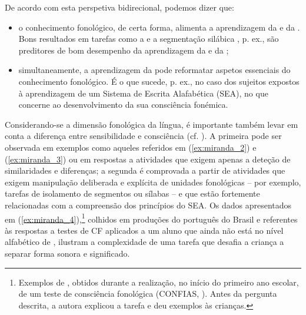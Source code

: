 \documentclass[output=paper]{LSP/langsci}
\begin{document}
De acordo com esta perspetiva bidirecional, podemos dizer que:
\begin{itemize}
\item o conhecimento fonológico, de certa forma, alimenta a aprendizagem da  e da . Bons resultados em tarefas como a  \citep{seidenbergtanenhaus1979} e a segmentação silábica \citep{treimandanis1988,ventura_etal2001}, p. ex., são preditores de bom desempenho da aprendizagem da  e da ;
\item simultaneamente, a aprendizagem da  pode reformatar aspetos essenciais do conhecimento fonológico. É o que sucede, p. ex., no caso dos sujeitos expostos à aprendizagem de um Sistema de Escrita Alafabética (SEA), no que concerne ao desenvolvimento da sua consciência fonémica.
\end{itemize}

Considerando-se a dimensão fonológica da língua, é importante também levar em conta a diferença entre sensibilidade e consciência (cf. \citealt{bowey1994}). A primeira pode ser observada em exemplos como aqueles referidos em (\ref{ex:miranda_2}) e (\ref{ex:miranda_3}) ou em respostas a atividades que exigem apenas a deteção de similaridades e diferenças; a segunda é comprovada a partir de atividades que exigem manipulação deliberada e explícita de unidades fonológicas -- por exemplo, tarefas de isolamento de segmentos ou sílabas -- e que estão fortemente relacionadas com a compreensão dos princípios do SEA. Os dados apresentados em (\ref{ex:miranda_4}),\footnote{Exemplos de \citet[230,232]{rigatti2008}, obtidos durante a realização, no início do primeiro ano escolar, de um teste de consciência fonológica (CONFIAS, \citealt{moojen_etal2003}). Antes da pergunta descrita, a autora explicou a tarefa e deu exemplos às crianças.} colhidos em produções do português do Brasil e referentes às respostas a testes de CF aplicados a um aluno que ainda não está no nível alfabético de , ilustram a complexidade de uma tarefa que desafia a criança a separar forma sonora e significado.

\ea\label{ex:miranda_4}
\z
\z
\end{document}

